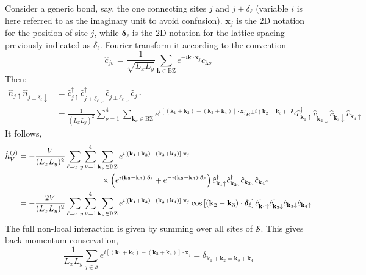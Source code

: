 Consider a generic bond, say, the one connecting sites $j$ and $j\pm\delta_\ell$ (variable $i$ is here referred to as the imaginary unit to avoid confusion). $\mathbf{x}_j$ is the $2$D notation for the position of site $j$, while $\bm{\delta}_\ell$ is the $2$D notation for the lattice spacing previously indicated as $\delta_\ell$. Fourier transform it according to the convention
\[
	\hat c_{j\sigma} = \frac{1}{\sqrt{L_xL_y}} \sum_{\mathbf{k} \in \mathrm{BZ}} e^{-i \mathbf{k} \cdot \mathbf{x}_j} \hat c_{\mathbf{k}\sigma}
\]
Then:
\[
\begin{aligned}
	\hat n_{j\uparrow} \hat n_{j \pm \delta_\ell \downarrow} &= \hat c_{j\uparrow}^\dagger \hat c_{j \pm \delta_\ell \downarrow}^\dagger \hat c_{j \pm \delta_\ell \downarrow} \hat c_{j\uparrow} \\
	&= \frac{1}{(L_xL_y)^2} \sum_{\nu=1}^4 \sum_{\mathbf{k}_\nu \in \mathrm{BZ}} e^{i \left[ (\mathbf{k}_1 + \mathbf{k}_2) - (\mathbf{k}_3 + \mathbf{k}_4) \right] \cdot \mathbf{x}_j} e^{\pm i(\mathbf{k}_2-\mathbf{k}_3) \cdot \bm{\delta}_\ell}  \hat c_{\mathbf{k}_1 \uparrow}^\dagger \hat c_{\mathbf{k}_2 \downarrow}^\dagger \hat c_{\mathbf{k}_3 \downarrow} \hat c_{\mathbf{k}_4\uparrow}
\end{aligned}
\]
It follows,
\[
\begin{aligned}
	\hat h_V^{(j)} &= -\frac{V}{(L_xL_y)^2} \sum_{\ell = x,y} \sum_{\nu=1}^4 \sum_{\mathbf{k}_\nu \in \mathrm{BZ}} e^{i \left[ (\mathbf{k}_1 + \mathbf{k}_2) - (\mathbf{k}_3 + \mathbf{k}_4) \right] \cdot \mathbf{x}_j} \\
	&\hspace{0.3\textwidth} \times \left(
		e^{ i(\mathbf{k}_2-\mathbf{k}_3) \cdot \bm{\delta}_\ell} + e^{ -i(\mathbf{k}_2-\mathbf{k}_3) \cdot \bm{\delta}_\ell} 
	\right)
	\hat c_{\mathbf{k}_1 \uparrow}^\dagger \hat c_{\mathbf{k}_2 \downarrow}^\dagger \hat c_{\mathbf{k}_3 \downarrow} \hat c_{\mathbf{k}_4\uparrow} \\
	&= -\frac{2V}{(L_xL_y)^2} \sum_{\ell = x,y} \sum_{\nu=1}^4 \sum_{\mathbf{k}_\nu \in \mathrm{BZ}} e^{i \left[ (\mathbf{k}_1 + \mathbf{k}_2) - (\mathbf{k}_3 + \mathbf{k}_4) \right] \cdot \mathbf{x}_j} \cos\left[
		(\mathbf{k}_2-\mathbf{k}_3) \cdot \bm{\delta}_\ell
	\right]	\hat c_{\mathbf{k}_1 \uparrow}^\dagger \hat c_{\mathbf{k}_2 \downarrow}^\dagger \hat c_{\mathbf{k}_3 \downarrow} \hat c_{\mathbf{k}_4\uparrow}
\end{aligned}
\]
The full non-local interaction is given by summing over all sites of $\mathcal{S}$. This gives back momentum conservation,
\[
	\frac{1}{L_xL_y} \sum_{j \in \mathcal{S}} e^{i \left[ (\mathbf{k}_1 + \mathbf{k}_2) - (\mathbf{k}_3 + \mathbf{k}_4) \right] \cdot \mathbf{x}_j} = \delta_{\mathbf{k}_1 + \mathbf{k}_2 = \mathbf{k}_3 + \mathbf{k}_4}
\]
